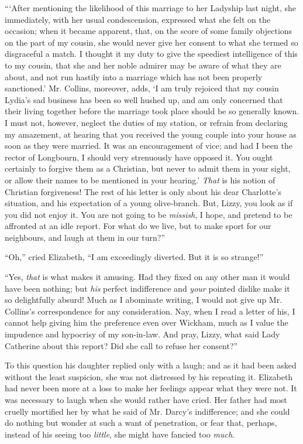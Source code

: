 \documentclass[12pt]{book}
\begin{document}
```After mentioning the likelihood of this marriage to her Ladyship last night, she immediately, with her usual condescension, expressed what she felt on the occasion; when it became apparent, that, on the score of some family objections on the part of my cousin, she would never give her consent to what she termed so disgraceful a match. I thought it my duty to give the speediest intelligence of this to my cousin, that she and her noble admirer may be aware of what they are about, and not run hastily into a marriage which has not been properly sanctioned.' Mr. Collins, moreover, adds, `I am truly rejoiced that my cousin Lydia's sad business has been so well hushed up, and am only concerned that their living together before the marriage took place should be so generally known. I must not, however, neglect the duties of my station, or refrain from declaring my amazement, at hearing that you received the young couple into your house as soon as they were married. It was an encouragement of vice; and had I been the rector of Longbourn, I should very strenuously have opposed it. You ought certainly to forgive them as a Christian, but never to admit them in your sight, or allow their names to be mentioned in your hearing.' \textit{That} is his notion of Christian forgiveness! The rest of his letter is only about his dear Charlotte's situation, and his expectation of a young olive-branch. But, Lizzy, you look as if you did not enjoy it. You are not going to be \textit{missish}, I hope, and pretend to be affronted at an idle report. For what do we live, but to make sport for our neighbours, and laugh at them in our turn?''

``Oh,'' cried Elizabeth, ``I am exceedingly diverted. But it is so strange!''

``Yes, \textit{that} is what makes it amusing. Had they fixed on any other man it would have been nothing; but \textit{his} perfect indifference and \textit{your} pointed dislike make it so delightfully absurd! Much as I abominate writing, I would not give up Mr. Collins's correspondence for any consideration. Nay, when I read a letter of his, I cannot help giving him the preference even over Wickham, much as I value the impudence and hypocrisy of my son-in-law. And pray, Lizzy, what said Lady Catherine about this report? Did she call to refuse her consent?''

To this question his daughter replied only with a laugh; and as it had been asked without the least suspicion, she was not distressed by his repeating it. Elizabeth had never been more at a loss to make her feelings appear what they were not. It was necessary to laugh when she would rather have cried. Her father had most cruelly mortified her by what he said of Mr. Darcy's indifference; and she could do nothing but wonder at such a want of penetration, or fear that, perhaps, instead of his seeing too \textit{little}, she might have fancied too \textit{much}.
\end{document}
